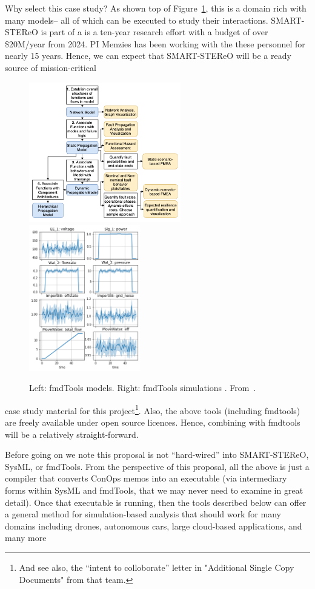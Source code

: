 \documentclass[twoside]{NSF}
\newcommand{\IT}{{\sffamily {\em \mbox{ADVICE}}}}
\begin{document}
\begin{nsfdescription}
 Why select this case study? As shown top of Figure~\ref{fsim}, this is a domain rich with  many models-- all of which can be executed to study their interactions.
 SMART-STEReO is part of a 
is a ten-year research effort with a budget of over \$20M/year from 2024.
PI Menzies has been working with the these personnel for nearly 15 years. Hence, we can expect that  
SMART-STEReO will be a ready source of 
mission-critical
\begin{figure}
\begin{center}
    \includegraphics[height=2.4in]{fig/fmdtools.png}   
    ~ 
    \includegraphics[height=2.5in]{fig/sim.png}
    \end{center}
\caption{Left:   fmdTools models. 
Right:  fmdTools  simulations .
From~\cite{hulse2021fmdtools}.}\label{fsim}
\end{figure} 
case study material for this project\footnote{And see also,  the ``intent to colloborate'' letter in "Additional Single Copy Documents" from that  team.}.
 Also,      the above tools     (including fmdtools) are freely available under open source licences. 
Hence, combining \IT{} with fmdtools will be a relatively straight-forward. 


Before going on we note   this proposal is not ``hard-wired'' into SMART-STEReO, SysML, or fmdTools.
From the perspective of this proposal, all the above
is just a  compiler that converts
ConOps memos into an executable (via intermediary forms within
SysML and fmdTools, that we may never need to examine in great detail).
 Once that executable is running, then the tools described  below can offer
 a general method for simulation-based analysis
 that should work for many   domains including
 drones,  autonomous cars, large cloud-based applications, and many more 


\end{nsfdescription}
\end{document}
